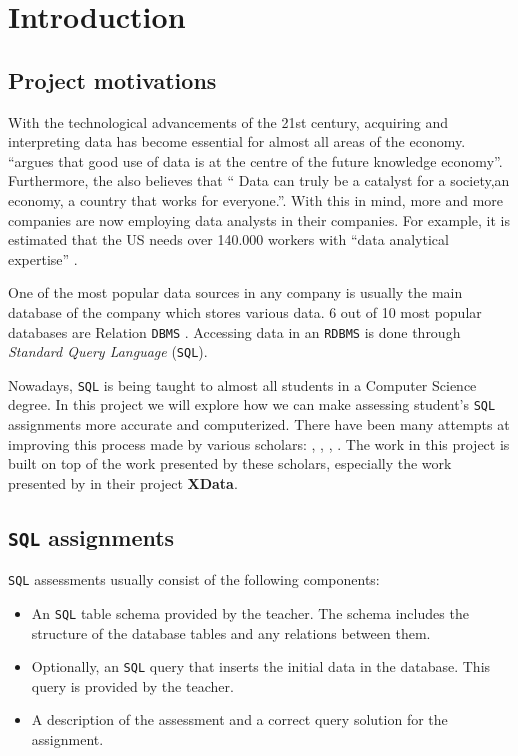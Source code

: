 \chapter{Introduction}
\section{Project motivations}
With the technological advancements of the 21st century, acquiring and interpreting
data has become essential for almost all areas of the economy.
\cite{ec:big_data} ``argues that good use of data is at
the centre of the future knowledge economy''.
Furthermore, the \cite{gov:big_data} also believes that ``
Data can truly be a catalyst for a society,an economy,
a country that works for everyone.''. With this in mind, more and more companies are now employing data analysts in
their companies. For example, it is estimated that the US needs over 140.000 workers with
``data analytical expertise'' \citep{Lohr2012}.

One of the most popular data sources
in any company is usually the main database of the company which stores various
data. 6 out of 10 most popular databases are Relation \texttt{DBMS} \citep{db_engine:statistics}.
Accessing data in an \texttt{RDBMS} is done through \textit{Standard Query Language}
(\texttt{SQL}).

Nowadays, \texttt{SQL} is being taught to almost all students in a Computer Science
degree. In this project we will explore how we can make assessing student's \texttt{SQL}
assignments more accurate and computerized. There have been many attempts at improving this process made
by various scholars: \cite{literature:activesql}, \cite{literature:assesql},
\cite{literature:sqlify}, \cite{literature:xdata}. The work in this project is built
on top of the work presented by these scholars, especially the work presented by
\cite{literature:xdata} in their project \textbf{XData}.

\section{\texttt{SQL} assignments}
\texttt{SQL} assessments usually consist of the following components:

\begin{itemize}
    \item An \texttt{SQL} table schema provided by the teacher. The schema includes
    the structure of the database tables and any relations between them.
    \item Optionally, an \texttt{SQL} query that inserts the initial data in the database.
    This query is provided by the teacher.
    \item A description of the assessment and a correct query solution for the
    assignment.
\end{itemize}

